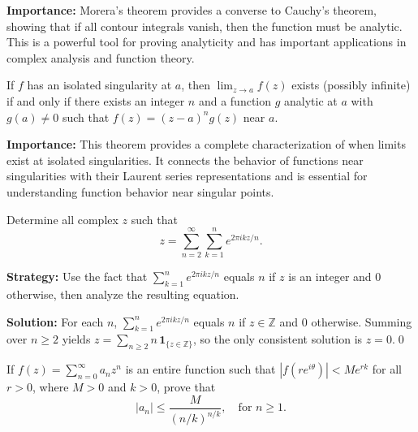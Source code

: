 \noindent\textbf{Importance:} Morera's theorem provides a converse to Cauchy's theorem, showing that if all contour integrals vanish, then the function must be analytic. This is a powerful tool for proving analyticity and has important applications in complex analysis and function theory.



\begin{theorem}
If $f$ has an isolated singularity at $a$, then $\lim_{z \to a} f(z)$ exists (possibly infinite) if and only if there exists an integer $n$ and a function $g$ analytic at $a$ with $g(a) \neq 0$ such that $f(z) = (z-a)^n g(z)$ near $a$.
\end{theorem}

\noindent\textbf{Importance:} This theorem provides a complete characterization of when limits exist at isolated singularities. It connects the behavior of functions near singularities with their Laurent series representations and is essential for understanding function behavior near singular points.





\begin{problembox}
\begin{problemstatement}
Determine all complex \( z \) such that
\[ z = \sum_{n=2}^{\infty} \sum_{k=1}^{n} e^{2\pi i k z / n}. \]
\end{problemstatement}
\end{problembox}

\noindent\textbf{Strategy:} Use the fact that \( \sum_{k=1}^n e^{2\pi i k z/n} \) equals \( n \) if \( z \) is an integer and \( 0 \) otherwise, then analyze the resulting equation.

\bigskip\noindent\textbf{Solution:}
For each $n$, $\sum_{k=1}^n e^{2\pi i k z/n}$ equals $n$ if $z\in\mathbb Z$ and $0$ otherwise. Summing over $n\ge2$ yields $z=\sum_{n\ge2} n\,\mathbf 1_{\{z\in\mathbb Z\}}$, so the only consistent solution is $z=0$.\qed


\begin{problembox}
\begin{problemstatement}
If \( f(z) = \sum_{n=0}^{\infty} a_n z^n \) is an entire function such that \( |f(r e^{i\theta})| < M e^{r k} \) for all \( r > 0 \), where \( M > 0 \) and \( k > 0 \), prove that
\[ |a_n| \leq \frac{M}{(n/k)^{n/k}}, \quad \text{for } n \geq 1. \]
\end{problemstatement}
\end{problembox}

